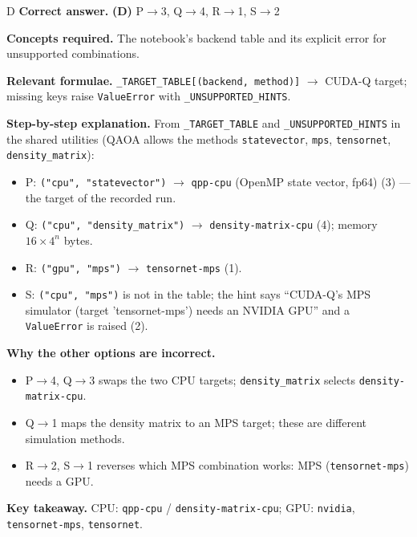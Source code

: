 \documentclass[11pt,a4paper]{article}
\newcommand{\qsep}{\par\vspace{2pt}{\color{black!15}\hrule}\vspace{4pt}}
\begin{document}
\begin{solbox}{D}
\textbf{\color{brand}Correct answer.} \textcolor{okgreen}{\textbf{(D)}} P$\to$3, Q$\to$4, R$\to$1, S$\to$2

\textbf{\color{brand}Concepts required.} The notebook's backend table and its explicit error for unsupported combinations.

\textbf{\color{brand}Relevant formulae.} \texttt{\_TARGET\_TABLE[(backend, method)]} $\to$ CUDA-Q target; missing keys raise \texttt{ValueError} with \texttt{\_UNSUPPORTED\_HINTS}.

\textbf{\color{brand}Step-by-step explanation.} From \texttt{\_TARGET\_TABLE} and \texttt{\_UNSUPPORTED\_HINTS} in the shared utilities (QAOA allows the methods
\texttt{statevector}, \texttt{mps}, \texttt{tensornet}, \texttt{density\_matrix}):
\begin{itemize}\itemsep0pt
\item P: \texttt{("cpu", "statevector")} $\to$ \texttt{qpp-cpu} (OpenMP state vector, fp64) (3) --- the target of the recorded run.
\item Q: \texttt{("cpu", "density\_matrix")} $\to$ \texttt{density-matrix-cpu} (4); memory $16\times4^n$ bytes.
\item R: \texttt{("gpu", "mps")} $\to$ \texttt{tensornet-mps} (1).
\item S: \texttt{("cpu", "mps")} is not in the table; the hint says ``CUDA-Q's MPS simulator (target 'tensornet-mps') needs an
NVIDIA GPU'' and a \texttt{ValueError} is raised (2).
\end{itemize}

\textbf{\color{brand}Why the other options are incorrect.}
\begin{itemize}[leftmargin=2.4em, itemsep=1pt, topsep=2pt]
\item[\textbf{(A)}] P$\to$4, Q$\to$3 swaps the two CPU targets; \texttt{density\_matrix} selects \texttt{density-matrix-cpu}.
\item[\textbf{(B)}] Q$\to$1 maps the density matrix to an MPS target; these are different simulation methods.
\item[\textbf{(C)}] R$\to$2, S$\to$1 reverses which MPS combination works: MPS (\texttt{tensornet-mps}) needs a GPU.
\end{itemize}
\textbf{\color{brand}Key takeaway.} CPU: \texttt{qpp-cpu} / \texttt{density-matrix-cpu}; GPU: \texttt{nvidia}, \texttt{tensornet-mps}, \texttt{tensornet}.
\end{solbox}
\qsep
\end{document}
